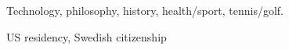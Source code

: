 \documentclass[../main.tex]{subfiles}
\begin{document}
{Technology, philosophy, history, health/sport, tennis/golf.}

{US residency, Swedish citizenship}
\end{document}
